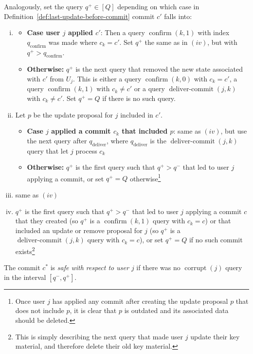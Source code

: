 \begin{definition}
	Analogously, set the query $q^+ \in [Q]$ depending on which case in Definition~\ref{def:last-update-before-commit} commit $c'$ falls into:
	\begin{enumerate}[(i)]
		\item \begin{itemize}
			      \item \textbf{Case user $j$ applied $c'$}: Then a query $\operatorname{confirm}(k, 1)$ with index $q_{\mathrm{confirm}}$ was made where $c_k = c'$. Set $q^+$ the same as in $(iv)$, but with $q^+ > q_{\mathrm{confirm}}$.
			      \item \textbf{Otherwise:} $q^+$ is the next query that removed the new state associated with $c'$ from $U_j$. This is either a query $\operatorname{confirm}(k, 0)$ with $c_k = c'$, a query $\operatorname{confirm}(k, 1)$ with $c_k \neq c'$ or a query $\operatorname{deliver-commit}(j, k)$ with $c_k \neq c'$. Set $q^+ = Q$ if there is no such query.
		      \end{itemize}
		\item Let $p$ be the update proposal for $j$ included in $c'$.
		      \begin{itemize}
			      \item \textbf{Case $j$ applied a commit $c_k$ that included $p$}: same as $(iv)$, but use the next query after $q_{\mathrm{deliver}}$, where $q_{\mathrm{deliver}}$ is the $\operatorname{deliver-commit}(j, k)$ query that let $j$ process $c_k$
			      \item \textbf{Otherwise:} $q^+$ is the first query such that $q^+ > q^-$ that led to user $j$ applying a commit, or set $q^+ = Q$ otherwise\footnote{Once user $j$ has applied any commit after creating the update proposal $p$ that does not include $p$, it is clear that $p$ is outdated and its associated data should be deleted.}
		      \end{itemize}
		\item same as $(iv)$
		\item $q^+$ is the first query such that $q^+ > q^-$ that led to user $j$ applying a commit $c$ that they created (so $q^+$ is a $\operatorname{confirm}(k, 1)$ query with $c_k = c$) or that included an update or remove proposal for $j$ (so $q^+$ is a $\operatorname{deliver-commit}(j, k)$ query with $c_k = c$), or set $q^+ = Q$ if no such commit exists\footnote{This is simply describing the next query that made user $j$ update their key material, and therefore delete their old key material.}
	\end{enumerate}

	The commit $c^*$ is \emph{safe with respect to user $j$} if there was no $\operatorname{corrupt}(j)$ query in the interval $[q^-, q^+]$.
\end{definition}

